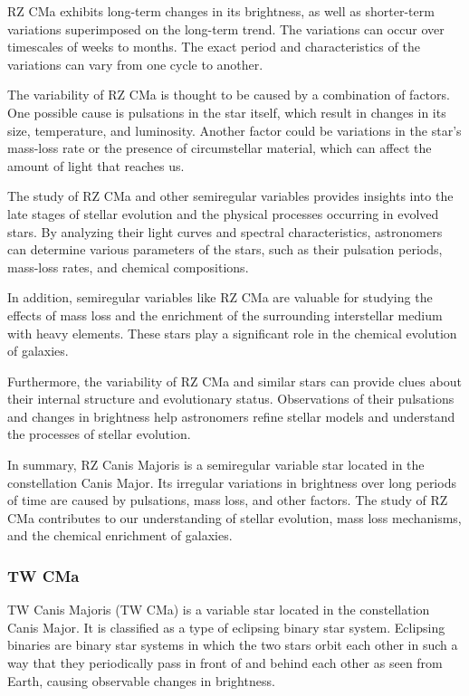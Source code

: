 RZ CMa exhibits long-term changes in its brightness, as well as shorter-term variations superimposed on the long-term trend. The variations can occur over timescales of weeks to months. The exact period and characteristics of the variations can vary from one cycle to another.

The variability of RZ CMa is thought to be caused by a combination of factors. One possible cause is pulsations in the star itself, which result in changes in its size, temperature, and luminosity. Another factor could be variations in the star's mass-loss rate or the presence of circumstellar material, which can affect the amount of light that reaches us.

The study of RZ CMa and other semiregular variables provides insights into the late stages of stellar evolution and the physical processes occurring in evolved stars. By analyzing their light curves and spectral characteristics, astronomers can determine various parameters of the stars, such as their pulsation periods, mass-loss rates, and chemical compositions.

In addition, semiregular variables like RZ CMa are valuable for studying the effects of mass loss and the enrichment of the surrounding interstellar medium with heavy elements. These stars play a significant role in the chemical evolution of galaxies.

Furthermore, the variability of RZ CMa and similar stars can provide clues about their internal structure and evolutionary status. Observations of their pulsations and changes in brightness help astronomers refine stellar models and understand the processes of stellar evolution.

In summary, RZ Canis Majoris is a semiregular variable star located in the constellation Canis Major. Its irregular variations in brightness over long periods of time are caused by pulsations, mass loss, and other factors. The study of RZ CMa contributes to our understanding of stellar evolution, mass loss mechanisms, and the chemical enrichment of galaxies.


\subsubsection*{ TW CMa }
TW Canis Majoris (TW CMa) is a variable star located in the constellation Canis Major. It is classified as a type of eclipsing binary star system. Eclipsing binaries are binary star systems in which the two stars orbit each other in such a way that they periodically pass in front of and behind each other as seen from Earth, causing observable changes in brightness.

